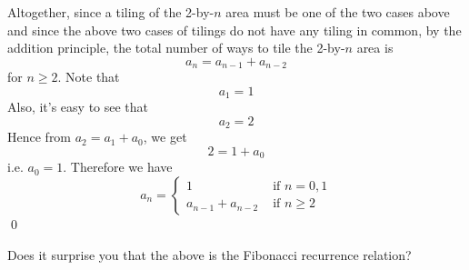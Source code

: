 Altogether, since a tiling of the 2-by-$n$ area must be one of the two cases
above and since the above two cases
of tilings do not have any tiling in common, by the addition principle,
the total number of ways to tile the 2-by-$n$ area is
\[
a_n = a_{n-1} + a_{n-2}
\]
for $n \geq 2$.
Note that
\[
a_1 = 1
\]
Also, it's easy to see that
\[
a_2 = 2
\]
Hence from $a_2 = a_1 + a_0$, we get
\[
2 = 1 + a_0
\]
i.e. $a_0 = 1$.
Therefore we have
\[
a_n =
\begin{cases}
1 & \text{ if } n = 0, 1 \\
a_{n-1} + a_{n - 2} &\text{ if } n \geq 2
\end{cases}
\]
\qed

Does it surprise you that the above is the Fibonacci recurrence relation?




\newpage
\newpage
\newpage
\newpage


